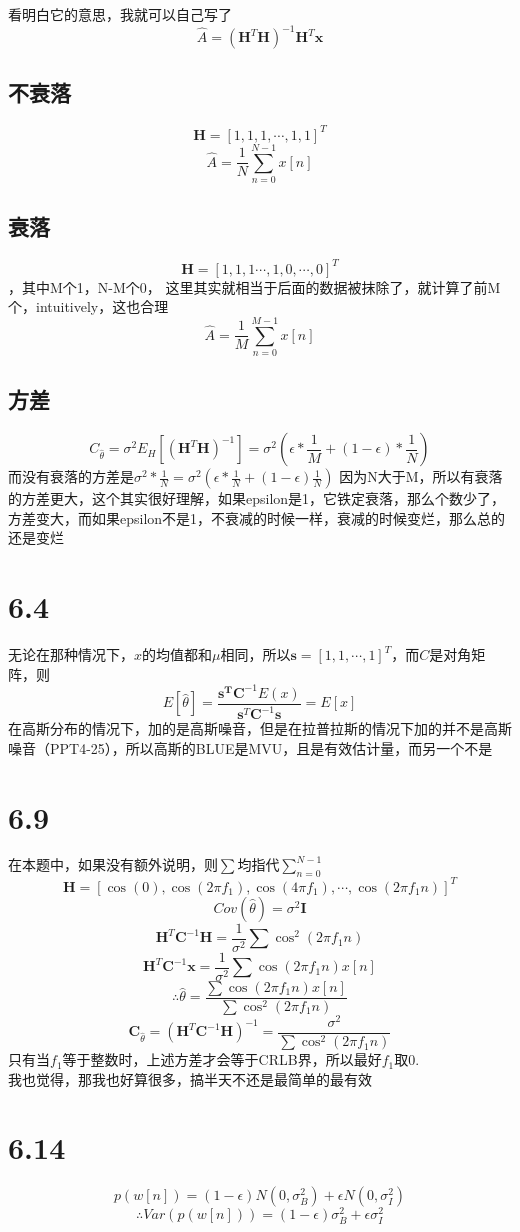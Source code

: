 \documentclass{article}
\begin{document}
看明白它的意思，我就可以自己写了
$$ \hat{A} = (\bm{H}^T\bm{H})^{-1}\bm{H}^T\bm{x} $$
\subsection{不衰落}
$$\bm{H}=\left[ 1,1,1,\cdots,1,1\right]^T$$
$$ \hat{A}=\frac{1}{N} \sum_{n=0}^{N-1}x[n]$$
\subsection{衰落} $$\bm{H}=\left[ 1,1,1\cdots,1,0,\cdots,0 \right]^T$$，其中M个1，N-M个0，
这里其实就相当于后面的数据被抹除了，就计算了前M个，intuitively，这也合理
$$ \hat{A}=\frac{1}{M} \sum_{n=0}^{M-1}x[n]$$
\subsection{方差}
$$ C_{\hat{\theta}}=\sigma^2E_H[(\bm{H}^T\bm{H})^{-1}]=\sigma^2(\epsilon*\frac{1}{M}+(1-\epsilon)*{\frac{1}{N}}) $$
而没有衰落的方差是$ \sigma^2*\frac{1}{N}=\sigma^2(\epsilon*\frac{1}{N}+(1-\epsilon)\frac{1}{N}) $
因为N大于M，所以有衰落的方差更大，这个其实很好理解，如果epsilon是1，它铁定衰落，那么个数少了，方差变大，而如果epsilon不是1，不衰减的时候一样，衰减的时候变烂，那么总的还是变烂
\section{6.4}
无论在那种情况下，$x$的均值都和$\mu$相同，所以$\bm{s}=[1,1,\cdots,1]^T$，而$ C $是对角矩阵，则
$$E[\hat{\theta}]= \frac{\bm{s^T}\bm{C}^{-1}E(x)}{\bm{s}^T\bm{C}^{-1}\bm{s}}=E[x] $$
在高斯分布的情况下，加的是高斯噪音，但是在拉普拉斯的情况下加的并不是高斯噪音（PPT4-25），所以高斯的BLUE是MVU，且是有效估计量，而另一个不是
\section{6.9}

在本题中，如果没有额外说明，则$\sum$均指代$\sum_{n=0}^{N-1}$
$$ \bm{H}=[\cos(0),\cos(2\pi f_1),\cos(4\pi f_1),\cdots,\cos(2\pi f_1n)]^T $$
$$ Cov(\hat{\theta})=\sigma^2\bm{I} $$
$$ \bm{H}^T\bm{C}^{-1}\bm{H}=\frac{1}{\sigma^2} \sum\cos^2(2\pi f_1 n)$$
$$ \bm{H}^T\bm{C}^{-1}\bm{x}=\frac{1}{\sigma^2} \sum\cos(2\pi f_1 n)x[n]$$
$$ \therefore \hat{\theta}=\frac{\sum\cos(2\pi f_1 n)x[n]}{\sum\cos^2(2\pi f_1 n)} $$
$$ \bm{C}_{\hat{\theta}}=(\bm{H}^T\bm{C}^{-1}\bm{H})^{-1}=\frac{\sigma^2}{\sum\cos^2(2\pi f_1 n) }$$
只有当$f_1$等于整数时，上述方差才会等于CRLB界，所以最好$f_1$取0.\\
我也觉得，那我也好算很多，搞半天不还是最简单的最有效
\section{6.14}
$$ p(w[n])=(1-\epsilon)N(0,\sigma_B^2)+\epsilon N(0,\sigma^2_I) $$
$$ \therefore Var(p(w[n]))=(1-\epsilon)\sigma_B^2+\epsilon\sigma_I^2 $$
\end{document}
